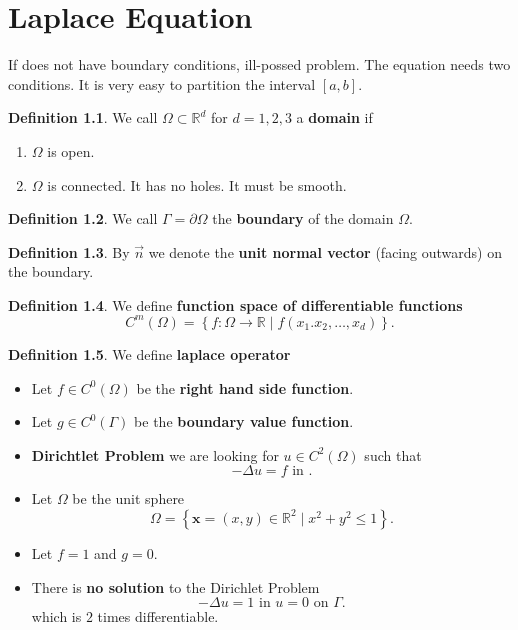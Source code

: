 \documentclass[openany,a4paper,11pt]{memoir}
\theoremstyle{definition}
\newtheorem{definition}{Definition}
\begin{document}
\chapter{Laplace Equation}

If does not have boundary conditions, ill-possed problem. The equation needs two conditions. It is very easy to partition the interval $[a,b]$.

\begin{definition}
  We call $\Omega\subset\mathbb{R}^d$ for $d=1,2,3$ a \textbf{domain} if
  \begin{enumerate}
  \item $\Omega$ is open.
  \item $\Omega$ is connected. It has no holes. It must be smooth.
  \end{enumerate}
\end{definition}

\begin{definition}
  We call $\Gamma=\partial\Omega$ the \textbf{boundary} of the domain $\Omega$.
\end{definition}

\begin{definition}
  By $\vec{n}$ we denote the \textbf{unit normal vector} (facing outwards) on the boundary.
\end{definition}

\begin{definition}
  We define \textbf{function space of differentiable functions} \[ C^m(\Omega)=\left\{ f\colon\Omega\rightarrow\mathbb{R}\mid f\left(x_1.x_2,\ldots, x_d\right) \right\}. \]
\end{definition}

\begin{definition}
  We define \textbf{laplace operator}
\end{definition}

\begin{itemize}
\item Let $f\in C^{0}(\Omega)$ be the \textbf{right hand side function}.
\item Let $g\in C^0(\Gamma)$ be the \textbf{boundary value function}.
\item \textbf{Dirichtlet Problem} we are looking for $u\in C^2(\Omega)$ such that \[ -\Delta u=f\text{ in }. \]
\item Let $\Omega$ be the unit sphere \[ \Omega=\left\{ \bm{x} = (x,y)\in\mathbb{R}^2\mid x^2+y^2\le 1 \right\}. \]
\item Let $f=1$ and $g=0$.
\item There is \textbf{no solution} to the Dirichlet Problem \[-\Delta u=1 \text{ in } u=0 \text{ on }\Gamma. \] which is $2$ times differentiable.
\end{itemize}
\end{document}
